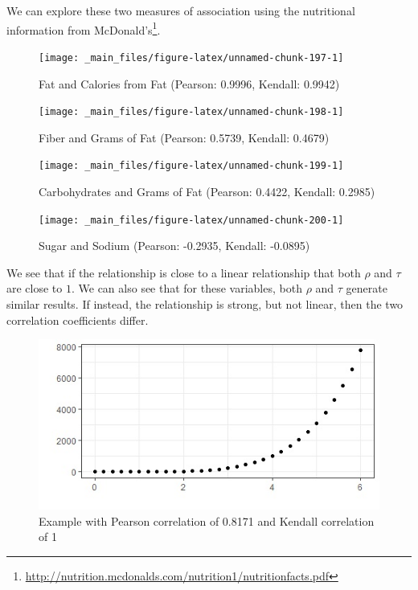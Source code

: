 \documentclass[
]{book}
\theoremstyle{definition}
\theoremstyle{definition}
\theoremstyle{definition}
\theoremstyle{definition}
\theoremstyle{remark}
\begin{document}
We can explore these two measures of association using the nutritional information from McDonald's\footnote{\url{http://nutrition.mcdonalds.com/nutrition1/nutritionfacts.pdf}}.

\begin{figure}

{\centering \texttt{[image: \_main\_files/figure-latex/unnamed-chunk-197-1]} 

}

\caption{Fat and Calories from Fat (Pearson: 0.9996, Kendall: 0.9942)}\label{fig:unnamed-chunk-197}
\end{figure}

\begin{figure}

{\centering \texttt{[image: \_main\_files/figure-latex/unnamed-chunk-198-1]} 

}

\caption{Fiber and Grams of Fat (Pearson: 0.5739, Kendall: 0.4679)}\label{fig:unnamed-chunk-198}
\end{figure}

\begin{figure}

{\centering \texttt{[image: \_main\_files/figure-latex/unnamed-chunk-199-1]} 

}

\caption{Carbohydrates and Grams of Fat (Pearson: 0.4422, Kendall: 0.2985)}\label{fig:unnamed-chunk-199}
\end{figure}

\begin{figure}

{\centering \texttt{[image: \_main\_files/figure-latex/unnamed-chunk-200-1]} 

}

\caption{Sugar and Sodium (Pearson: -0.2935, Kendall: -0.0895)}\label{fig:unnamed-chunk-200}
\end{figure}

We see that if the relationship is close to a linear relationship that both \(\rho\) and \(\tau\) are close to \(1\). We can also see that for these variables, both \(\rho\) and \(\tau\) generate similar results. If instead, the relationship is strong, but not linear, then the two correlation coefficients differ.

\begin{figure}

{\centering \includegraphics[width=0.8\linewidth]{images/correl_example1} 

}

\caption{Example with Pearson correlation of 0.8171 and Kendall correlation of 1}\label{fig:unnamed-chunk-201}
\end{figure}
\end{document}
